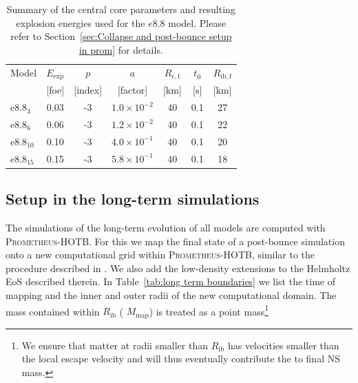 \documentclass[fleqn,usenatbib]{mnras}
\newcommand{\km}{\ensuremath{\mathrm{km}}}
\newcommand{\s}{\ensuremath{\text{s}}}
\newcommand{\prom}{\textsc{Prometheus-HOTB}\xspace}
\begin{document}
\begin{table}
\centering
\caption{Summary of the central core parameters and resulting explosion energies used for the $e8.8$ model. Please refer to Section~\ref{sec:Collapse and post-bounce setup in prom} for details.}
  \label{table:e8param}
   \begin{tabular}{l  c   c   c   c   c   c}
  \hline
  Model &
  $E_{\mathrm{exp}}$ &
  $p$ & 
  $a$ & 
  $R_{\mathrm{c,f}}$ &
  $t_0$ & 
  $R_{\mathrm{ib,f}}$ \\
                &
  [foe] &
  [index] &
  [factor] &
  [$\km$]  &
  [$\s$] &
  [$\km$] \\
  \hline
  $\mathrm{e}8.8_{3}$  & 0.03 & -3 & $1.0\times 10^{-2}$ & 40 & 0.1 &  27 \\
  $\mathrm{e}8.8_{6}$  & 0.06 & -3 & $1.2\times 10^{-2}$ & 40 & 0.1 &  22 \\
  $\mathrm{e}8.8_{10}$ & 0.10 & -3 & $4.0\times 10^{-1}$ & 40 & 0.1 &  20 \\
  $\mathrm{e}8.8_{15}$ & 0.15 & -3 & $5.8\times 10^{-1}$ & 40 & 0.1 &  18 \\
  \hline
  \end{tabular}
\end{table}

\subsection{Setup in the long-term simulations}
\label{Setup during the long-term evolution}
The simulations of the long-term evolution of all models are computed with \prom. 
For this we map the final state of a post-bounce simulation onto a new computational grid within \prom, similar to the procedure described in \cite{Wongwathanarat2015}. We also add the low-density extensions to the Helmholtz EoS described therein. In Table~\ref{tab:long term boundaries} we list the time of mapping and the inner and outer radii of the new computational domain. The mass contained within $R_{\mathrm{ib}}$ ( $M_{\mathrm{map}}$) is treated as a point mass\footnote{We ensure that matter at radii smaller than $R_{\mathrm{ib}}$ has velocities smaller than the local escape velocity and will thus eventually contribute the to final NS mass.}
\end{document}
